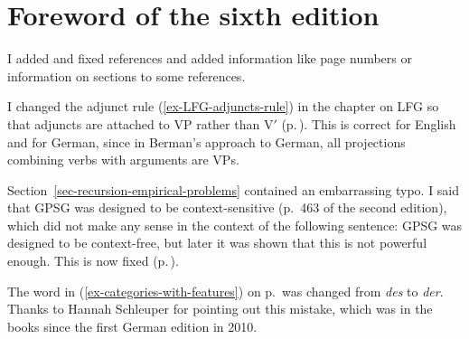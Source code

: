 
\section*{Foreword of the sixth edition}



I added and fixed references and added information like page numbers or information on sections to
some references.

I changed the adjunct rule (\ref{ex-LFG-adjuncts-rule}) in the chapter on LFG so that adjuncts are attached to VP rather than
V$'$ (p.\,\pageref{ex-LFG-adjuncts-rule}). This is correct for English and for German, since in Berman's approach to German, all
projections combining verbs with arguments are VPs.
%


%
%
Section~\ref{sec-recursion-empirical-problems} contained an embarrassing typo. I said that GPSG was designed to be
context-sensitive (p.~463 of the second edition), which did not make any sense in the context of the
following sentence: GPSG was designed to be context-free, but later it was shown that this is not
powerful enough. This is now fixed (p.\,\pageref{page-GPSG-context-free}).


The word in (\ref{ex-categories-with-features}) on p.\,\pageref{ex-categories-with-features} was
changed from \emph{des} to \emph{der}. Thanks to Hannah Schleuper for
pointing out this mistake, which was in the books since the first German edition in 2010. 



